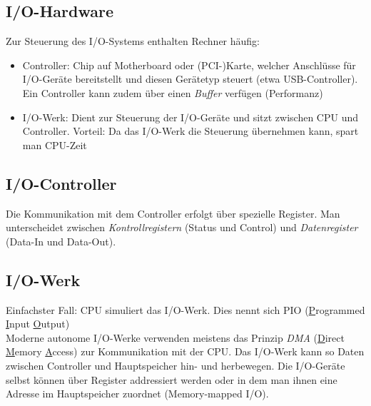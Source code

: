 \documentclass[11pt]{scrartcl}
\begin{document}
\subsection{I/O-Hardware}
Zur Steuerung des I/O-Systems enthalten Rechner häufig:

\begin{itemize}
	\item{Controller: Chip auf Motherboard oder (PCI-)Karte, welcher Anschlüsse für I/O-Geräte bereitstellt und diesen Gerätetyp steuert (etwa USB-Controller). Ein Controller kann zudem über einen \textit{Buffer} verfügen (Performanz)}
	\item{I/O-Werk: Dient zur Steuerung der I/O-Geräte und sitzt zwischen CPU und Controller. Vorteil: Da das I/O-Werk die Steuerung übernehmen kann, spart man CPU-Zeit}
\end{itemize}

\subsection{I/O-Controller}
Die Kommunikation mit dem Controller erfolgt über spezielle Register. Man unterscheidet zwischen \textit{Kontrollregistern} (Status und Control) und \textit{Datenregister} (Data-In und Data-Out).

\subsection{I/O-Werk}
Einfachster Fall: CPU simuliert das I/O-Werk. Dies nennt sich PIO (\underline Programmed \underline Input \underline Output)\\

Moderne autonome I/O-Werke verwenden meistens das Prinzip \textit{DMA} (\underline Direct \underline Memory \underline Access) zur Kommunikation mit der CPU. Das I/O-Werk kann so Daten zwischen Controller und Hauptspeicher hin- und herbewegen. Die I/O-Geräte selbst können über Register addressiert werden oder in dem man ihnen eine Adresse im Hauptspeicher zuordnet (Memory-mapped I/O).
\end{document}
